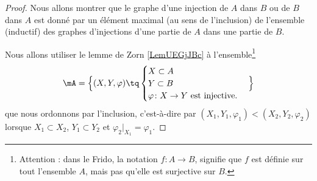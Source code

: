 \begin{proof}
    Nous allons montrer que le graphe d'une injection de $A$ dans $B$ ou de $B$ dans $A$ est donné par un élément maximal (au sens de l'inclusion) de l'ensemble (inductif) des graphes d'injections d'une partie de $A$ dans une partie de $B$.

    Nous allons utiliser le lemme de Zorn \ref{LemUEGjJBc} à l'ensemble\footnote{Attention : dans le Frido, la notation \( f\colon A\to B\), signifie que \( f\) est définie sur tout l'ensemble \( A\), mais pas qu'elle est surjective sur \( B\).}
    \begin{equation}
       \mA=\Big\{  (X,Y,\varphi)  \tq
        \begin{cases}
            X\subset A\\
            Y\subset B\\
            \varphi\colon X\to Y\text{ est injective.}
        \end{cases}
    \Big\}
    \end{equation}
    que nous ordonnons par l'inclusion, c'est-à-dire par \( (X_1,Y_1,\varphi_1)<(X_2,Y_2,\varphi_2)\) lorsque \( X_1\subset X_2\), \( Y_{1}\subset Y_2\) et \( \varphi_2|_{X_1}=\varphi_1\).


\end{proof}
